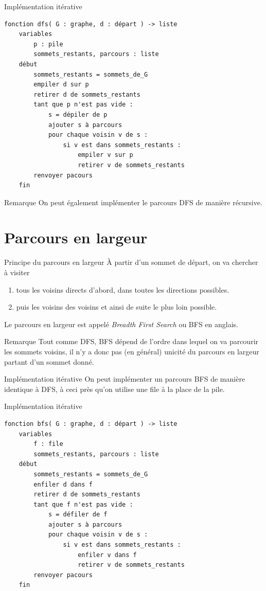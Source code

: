 \documentclass[10pt]{beamer}
\begin{document}
\begin{frame}[fragile]{Implémentation itérative}
\small
\begin{verbatim}
fonction dfs( G : graphe, d : départ ) -> liste
    variables
        p : pile
        sommets_restants, parcours : liste
    début
        sommets_restants = sommets_de_G
        empiler d sur p
        retirer d de sommets_restants
        tant que p n'est pas vide :
            s = dépiler de p
            ajouter s à parcours
            pour chaque voisin v de s :
                si v est dans sommets_restants :
                    empiler v sur p
                    retirer v de sommets_restants
        renvoyer pacours
    fin
\end{verbatim}
\normalsize
\end{frame}


\begin{frame}{Remarque}
On peut également implémenter le parcours DFS de manière récursive.
\end{frame}
\section*{Parcours en largeur}
\begin{frame}{Principe du parcours en largeur}
À partir d'un sommet de départ, on va chercher à visiter
\begin{enumerate}[\bfseries 1.]
	\item tous les voisins directs d'abord, dans toutes les \og directions\fg{} possibles.
    \item puis les voisins des voisins et ainsi de suite le plus loin possible.
\end{enumerate}
Le parcours en largeur est appelé \textit{Breadth First Search} ou BFS en anglais.
\end{frame}
\begin{frame}{Remarque}
Tout comme DFS, BFS dépend de l'ordre dans lequel on va parcourir les sommets voisins, il n'y a donc pas (en général) unicité du parcours en largeur partant d'un sommet donné.
\end{frame}

\begin{frame}{Implémentation itérative}
On peut implémenter un parcours BFS de manière identique à DFS, à ceci près qu'on utilise une \alert{file} à la place de la pile.
\end{frame}

\begin{frame}[fragile]{Implémentation itérative}
    \small
\begin{verbatim}
fonction bfs( G : graphe, d : départ ) -> liste
    variables
        f : file
        sommets_restants, parcours : liste
    début
        sommets_restants = sommets_de_G
        enfiler d dans f
        retirer d de sommets_restants
        tant que f n'est pas vide :
            s = défiler de f
            ajouter s à parcours
            pour chaque voisin v de s :
                si v est dans sommets_restants :
                    enfiler v dans f
                    retirer v de sommets_restants
        renvoyer pacours
    fin
\end{verbatim}
\normalsize
\end{frame}
\end{document}
